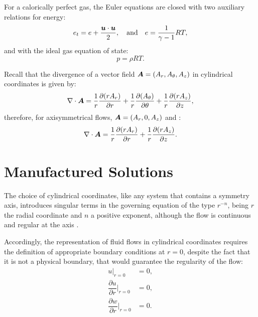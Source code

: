 \documentclass[10pt]{article}
\newcommand{\bv}[1]{\ensuremath{\mbox{\boldmath$ #1 $}}}
\newcommand{\Diff}[2] {\dfrac{\partial( #1)}{\partial #2}}
\newcommand{\diff}[2] {\dfrac{\partial #1}{\partial #2}}
\begin{document}
For a calorically perfect gas, the Euler equations are closed with two auxiliary relations for energy:
\begin{equation}
 \label{eq:euler_04}
e_t= e+\dfrac{\bv{u}\cdot \bv{u}}{2},\quad\mbox{and}\quad e=\dfrac{1}{\gamma -1}RT ,
\end{equation}
and with the ideal gas equation of state:
\begin{equation}
 \label{eq:euler_05}
p=\rho RT.
\end{equation}

Recall that the  divergence of a vector field $\bv{A}=(A_r,A_\theta,A_z)$ in cylindrical coordinates is given by:
\begin{equation*}
 \nabla\cdot \bv{A}= \dfrac{1}{r}\Diff{r A_r}{r} +\dfrac{1}{r}\Diff{ A_\theta}{\theta} +\dfrac{1}{r}\Diff{r A_z}{z},
\end{equation*}
therefore, for axisymmetrical flows,  $\bv{A}=(A_r,0,A_z)$  and :
\begin{equation*}
 \nabla\cdot \bv{A}= \dfrac{1}{r}\Diff{r A_r}{r}  +\dfrac{1}{r}\Diff{r A_z}{z}.
\end{equation*}


\section{Manufactured Solutions}

The choice of cylindrical coordinates, like any system that contains a symmetry axis, introduces singular terms in the governing equation of the type $r^{-n}$, being $r$ the radial coordinate and $n$ a positive exponent, %
 although the flow is continuous and regular at the axis \cite{Domenichini2004}.


Accordingly, the representation of fluid flows in cylindrical coordinates requires the definition of appropriate boundary conditions at $r=0$, despite the fact that it is not a physical boundary, that would guarantee the regularity of the flow: %
\begin{equation}
\label{cc}
\begin{split}
u \big| _{r=0} &=0,\\
 \diff{u}{r}\Big| _{r=0} &=0,\\
\diff{w}{r}\Big| _{r=0} &=0.\\
\end{split}
\end{equation}
\end{document}
